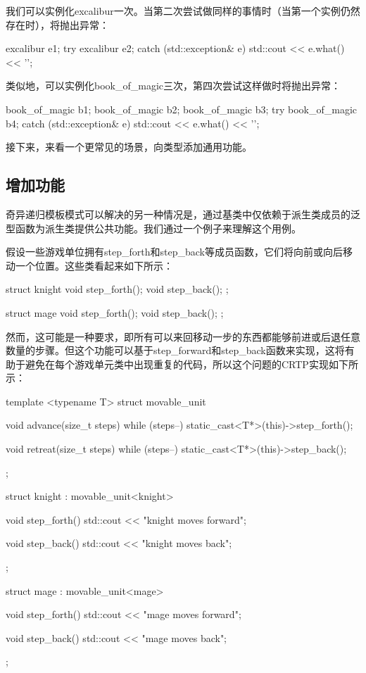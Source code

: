 我们可以实例化excalibur一次。当第二次尝试做同样的事情时（当第一个实例仍然存在时），将抛出异常：

\begin{cpp}
excalibur e1;
try
{
	excalibur e2;
}
catch (std::exception& e)
{
	std::cout << e.what() << '\n';
}
\end{cpp}

类似地，可以实例化book\_of\_magic三次，第四次尝试这样做时将抛出异常：

\begin{cpp}
book_of_magic b1;
book_of_magic b2;
book_of_magic b3;
try
{
	book_of_magic b4;
}
catch (std::exception& e)
{
	std::cout << e.what() << '\n';
}
\end{cpp}

接下来，来看一个更常见的场景，向类型添加通用功能。

\subsection{增加功能}

奇异递归模板模式可以解决的另一种情况是，通过基类中仅依赖于派生类成员的泛型函数为派生类提供公共功能。我们通过一个例子来理解这个用例。

假设一些游戏单位拥有step\_forth和step\_back等成员函数，它们将向前或向后移动一个位置。这些类看起来如下所示：

\begin{cpp}
struct knight
{
	void step_forth();
	void step_back();
};

struct mage
{
	void step_forth();
	void step_back();
};
\end{cpp}

然而，这可能是一种要求，即所有可以来回移动一步的东西都能够前进或后退任意数量的步骤。但这个功能可以基于step\_forward和step\_back函数来实现，这将有助于避免在每个游戏单元类中出现重复的代码，所以这个问题的CRTP实现如下所示：

\begin{cpp}
template <typename T>
struct movable_unit
{
	void advance(size_t steps)
	{
		while (steps--)
			static_cast<T*>(this)->step_forth();
	}

	void retreat(size_t steps)
	{
		while (steps--)
			static_cast<T*>(this)->step_back();
	}
};

struct knight : movable_unit<knight>
{
	void step_forth()
	{ std::cout << "knight moves forward\n"; }
	
	void step_back()
	{ std::cout << "knight moves back\n"; }
};

struct mage : movable_unit<mage>
{
	void step_forth()
	{ std::cout << "mage moves forward\n"; }
	
	void step_back()
	{ std::cout << "mage moves back\n"; }
};
\end{cpp}

